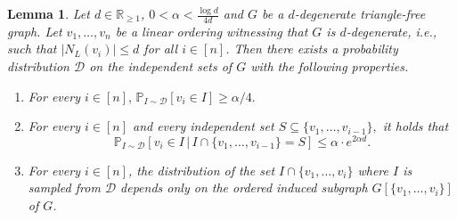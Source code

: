 \documentclass[10pt]{amsart}
\newtheorem{lemma}[theorem]{Lemma}
\theoremstyle{definition}
\newcommand{\calD}{\mathcal{D}}
\renewcommand{\Pr}{\mathbb{P}}
\begin{document}
\begin{lemma} \label{lem:main}
    Let $d\in \mathbb{R}_{\ge 1}$, $0 < \alpha < \frac{\log d}{4d}$ and $G$ be a $d$-degenerate triangle-free graph. Let $v_1,\ldots,v_n$ be a linear ordering witnessing that $G$ is $d$-degenerate, i.e., such that $|N_L(v_i)|\le d$ for all $i\in [n]$. Then there exists a probability distribution $\mathcal{D}$ on the independent sets of $G$ with the following properties.

    \begin{enumerate}[label=\alph*)]
        \item \label{prop:large-prob} For every $i \in [n], \, \Pr_{I \sim \calD}[v_i \in I] \ge \alpha / 4.$
        \item \label{prop:prob-not-too-big} For every $i \in [n]$ and every independent set $S \subseteq \{v_1, \dots, v_{i-1}\},$ it holds that
        \[ \Pr_{I \sim \calD}[v_i \in I \, \vert \, I \cap \{v_1, \dots, v_{i-1}\} = S] \le \alpha \cdot e^{2 \alpha d}. \]
        \item \label{prop:indepofwhatcomesafter} For every $i\in [n]$, the distribution of the set $I\cap \{v_1,\ldots,v_i\}$ where $I$ is sampled from $\mathcal{D}$ depends only on the ordered induced subgraph $G[\{v_1,\ldots,v_{i}\}]$ of $G$.
    \end{enumerate}
\end{lemma}
\end{document}

